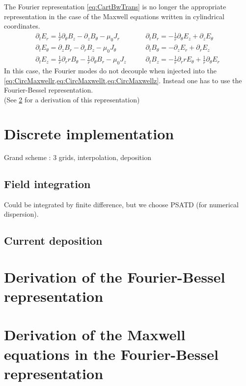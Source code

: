 \documentclass[a4paper]{article}   	%
\newcommand{\ir}{\frac{1}{r}}
\begin{document}
The Fourier representation \cref{eq:CartBwTrans} is no longer the appropriate representation in the case of the Maxwell equations written in cylindrical coordinates.
\begin{align}
\partial_t E_r = \ir \partial_\theta B_z - \partial_z B_\theta - \mu_0  J_r \qquad&   
\partial_t B_r = -\ir \partial_\theta E_z + \partial_z E_\theta \label{eq:CircMaxwellr} \\
\partial_t E_\theta = \partial_z B_r - \partial_r B_z - \mu_0  J_\theta \qquad &   
\partial_t B_\theta = -\partial_z E_r + \partial_r E_z \label{eq:CircMaxwellt}  \\
\partial_t E_z = \ir\partial_r r B_\theta - \ir\partial_\theta B_r - \mu_0  J_z \qquad &   
\partial_t B_z = -\ir\partial_r r E_\theta + \ir\partial_\theta E_r \label{eq:CircMaxwellz} 
\end{align}
In this case, the Fourier modes do not decouple when injected into the \cref{eq:CircMaxwellr,eq:CircMaxwellt,eq:CircMaxwellz}. Instead one has to use the Fourier-Bessel representation.
\begin{equation}
\end{equation}
 (See \cref{sec:CircTrans} for a derivation of this
 representation)

\section{Discrete implementation}

Grand scheme :
3 grids, interpolation, deposition 

\subsection{Field integration}

Could be integrated by finite difference, but we choose PSATD (for numerical dispersion).

\subsection{Current deposition}

\subsection{} 

\appendix

\section{Derivation of the Fourier-Bessel representation}
\label{sec:CircTrans}

\section{Derivation of the Maxwell equations in the Fourier-Bessel representation}
\end{document}
